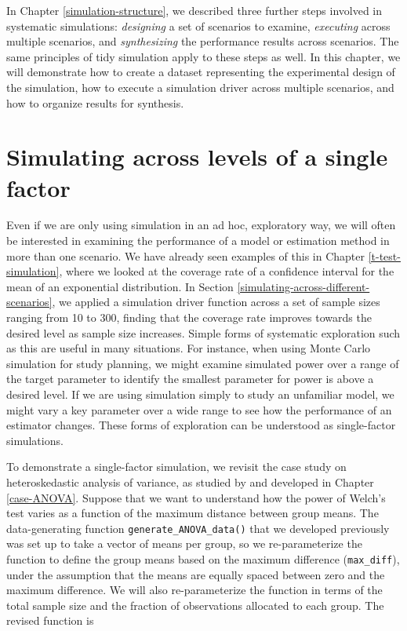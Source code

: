 \documentclass[
]{book}
\begin{document}
In Chapter \ref{simulation-structure}, we described three further steps involved in systematic simulations: \emph{designing} a set of scenarios to examine, \emph{executing} across multiple scenarios, and \emph{synthesizing} the performance results across scenarios.
The same principles of tidy simulation apply to these steps as well.
In this chapter, we will demonstrate how to create a dataset representing the experimental design of the simulation, how to execute a simulation driver across multiple scenarios, and how to organize results for synthesis.

\section{Simulating across levels of a single factor}\label{simulating-across-levels-of-a-single-factor}

Even if we are only using simulation in an ad hoc, exploratory way, we will often be interested in examining the performance of a model or estimation method in more than one scenario.
We have already seen examples of this in Chapter \ref{t-test-simulation}, where we looked at the coverage rate of a confidence interval for the mean of an exponential distribution.
In Section \ref{simulating-across-different-scenarios}, we applied a simulation driver function across a set of sample sizes ranging from 10 to 300, finding that the coverage rate improves towards the desired level as sample size increases.
Simple forms of systematic exploration such as this are useful in many situations.
For instance, when using Monte Carlo simulation for study planning, we might examine simulated power over a range of the target parameter to identify the smallest parameter for power is above a desired level.
If we are using simulation simply to study an unfamiliar model, we might vary a key parameter over a wide range to see how the performance of an estimator changes.
These forms of exploration can be understood as single-factor simulations.

To demonstrate a single-factor simulation, we revisit the case study on heteroskedastic analysis of variance, as studied by \citet{brown1974SmallSampleBehavior} and developed in Chapter \ref{case-ANOVA}.
Suppose that we want to understand how the power of Welch's test varies as a function of the maximum distance between group means.
The data-generating function \texttt{generate\_ANOVA\_data()} that we developed previously was set up to take a vector of means per group, so we re-parameterize the function to define the group means based on the maximum difference (\texttt{max\_diff}), under the assumption that the means are equally spaced between zero and the maximum difference.
We will also re-parameterize the function in terms of the total sample size and the fraction of observations allocated to each group.
The revised function is
\end{document}
